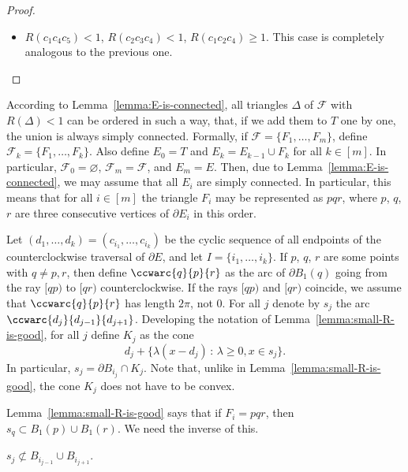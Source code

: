 \begin{appendices}
\begin{proof}
\begin{itemize}
    \item $R(c_1c_4c_5) < 1$, $R(c_2c_3c_4) < 1$, $R(c_1c_2c_4)\geq 1$. This case is completely analogous to the previous one.
\end{itemize}
\end{proof}

According to Lemma~\ref{lemma:E-is-connected}, all triangles $\Delta$ of $\mathcal{F}$ with $R(\Delta) < 1$ can be ordered in such a way, that, if we add them to $T$ one by one, the union is always simply connected. Formally, if $\mathcal{F} = \{F_1, \ldots, F_m\}$, define $\mathcal{F}_k = \{F_1, \ldots, F_k\}$. Also define $E_0 = T$ and $E_k = E_{k-1}\cup F_k$ for all $k\in[m]$. In particular, $\mathcal{F}_0 = \varnothing$, $\mathcal{F}_m = \mathcal{F}$, and $E_m = E$. Then, due to Lemma~\ref{lemma:E-is-connected}, we may assume that all $E_i$ are simply connected. In particular, this means that for all $i\in[m]$ the triangle $F_i$ may be represented as $pqr$, where $p$, $q$, $r$ are three consecutive vertices of $\partial E_i$ in this order.

Let $(d_1, \ldots, d_k) = (c_{i_1}, \ldots, c_{i_k})$ be the cyclic sequence of all endpoints of the counterclockwise traversal of $\partial{E}$, and let $I = \{i_1, \ldots, i_k\}$.
If $p$, $q$, $r$ are some points with $q\neq p, r$, then define $\ccwarc{q}{p}{r}$ as the arc of $\partial B_1(q)$ going from the ray $[qp)$ to $[qr)$ counterclockwise. If the rays $[qp)$ and $[qr)$ coincide, we assume that $\ccwarc{q}{p}{r}$ has length $2\pi$, not $0$.
For all $j$ denote by $s_j$ the arc $\ccwarc{d_j}{d_{j-1}}{d_{j+1}}$.
Developing the notation of Lemma~\ref{lemma:small-R-is-good}, for all $j$ define $K_j$ as the cone
$$d_j + \{\lambda (x - d_j)\,\colon\,\lambda\geq 0, x\in s_j\}.$$
In particular, $s_j = \partial B_{i_j}\cap K_j$. Note that, unlike in Lemma~\ref{lemma:small-R-is-good}, the cone $K_j$ does not have to be convex.

Lemma~\ref{lemma:small-R-is-good} says that if $F_i = pqr$, then $s_q\subset B_1(p)\cup B_1(r)$. We need the inverse of this.

\begin{lemma}\label{lemma:covered-arc-implies-small-R}
$s_j\not\subset B_{i_{j-1}}\cup B_{i_{j+1}}$.
\end{lemma}


\end{appendices}
